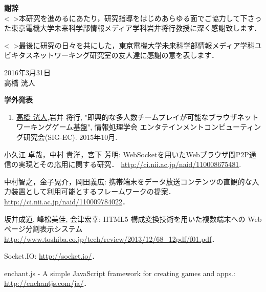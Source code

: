 \newpage

\begin{flushleft}
{\huge{\bf 謝辞}}\\
\vspace{1cm}
<\ >本研究を進めるにあたり，研究指導をはじめあらゆる面でご協力して下さった東京電機大学未来科学部情報メディア学科岩井将行教授に深く感謝致します．
\par
<\ >最後に研究の日々を共にした，東京電機大学未来科学部情報メディア学科ユビキタスネットワーキング研究室の友人達に感謝の意を表します．\\

\vspace{3cm}
\begin{flushright}
2016年3月31日\\
高橋 洸人\\
\end{flushright}
\end{flushleft}




\newpage



\begin{flushleft}
{\huge{\bf 学外発表}}\\
\vspace{1cm}
\begin{enumerate}
	
\item \underline{高橋 洸人},岩井 将行, "即興的な多人数チームプレイが可能なブラウザネットワーキングゲーム基盤", 情報処理学会 エンタテインメントコンピューティング研究会(SIG-EC). 2015年10月.

\end{enumerate}
\end{flushleft}


\newpage

\renewcommand{\bibname}{参考文献}

\begin{thebibliography}{1}
        小久江 卓哉，中村 貴洋，宮下 芳明:
        WebSocketを用いたWebブラウザ間P2P通信の実現とその応用に関する研究．
        \url{http://ci.nii.ac.jp/naid/110008675481}.

        中村智之，金子晃介，岡田義広:
        携帯端末をデータ放送コンテンツの直観的な入力装置として利用可能とするフレームワークの提案．
        \url{http://ci.nii.ac.jp/naid/110009784022}．

        坂井成道, 峰松美佳, 会津宏幸:
        HTML5 構成変換技術を用いた複数端末への Web ページ分割表示システム
        \url{http://www.toshiba.co.jp/tech/review/2013/12/68_12pdf/f01.pdf}．

        Socket.IO:
        \url{http://socket.io/}．

        enchant.js - A simple JavaScript framework for creating games and apps.:
        \url{http://enchantjs.com/ja/}．
\end{thebibliography}
